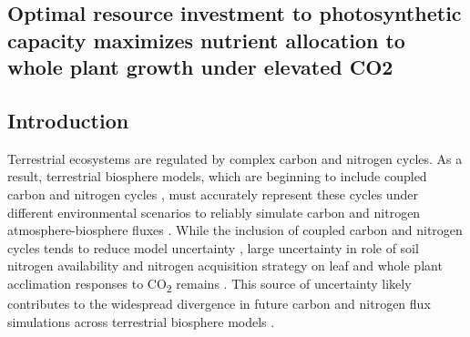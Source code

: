 \begin{singlespace}
    \chapter{\textbf{Optimal resource investment to photosynthetic capacity maximizes nutrient allocation to whole plant growth under elevated CO2}}
\end{singlespace}
    
\section{Introduction}

Terrestrial ecosystems are regulated by complex carbon and nitrogen cycles. As a result, terrestrial biosphere models, which are beginning to include coupled carbon and nitrogen cycles , must accurately represent these cycles under different environmental scenarios to reliably simulate carbon and nitrogen atmosphere-biosphere fluxes . While the inclusion of coupled carbon and nitrogen cycles tends to reduce model uncertainty , large uncertainty in role of soil nitrogen availability and nitrogen acquisition strategy on leaf and whole plant acclimation responses to CO\textsubscript{2} remains . This source of uncertainty likely contributes to the widespread divergence in future carbon and nitrogen flux simulations across terrestrial biosphere models .

